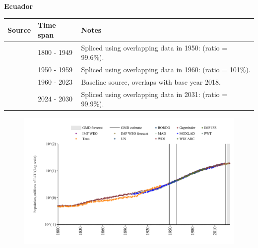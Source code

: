 \documentclass[12pt,a4paper,landscape]{article}
\begin{document}
\begin{adjustbox}{max totalsize={\paperwidth}{\paperheight},center}
\begin{minipage}[t][\textheight][t]{\textwidth}
\vspace*{0.5cm}
{}
\begin{center}
{\Large\bfseries Ecuador}
\end{center}
\vspace{0.5cm}
\begin{table}[H]
\centering
\small
\begin{tabular}{|l|l|l|}
\hline
\textbf{Source} & \textbf{Time span} & \textbf{Notes} \\
\hline
\rowcolor{white}\cite{Gapminder}& 1800 - 1949 &Spliced using overlapping data in 1950: (ratio = 99.6\%).\\
\rowcolor{lightgray}\cite{IMF_IFS}& 1950 - 1959 &Spliced using overlapping data in 1960: (ratio = 101\%).\\
\rowcolor{white}\cite{WDI}& 1960 - 2023 &Baseline source, overlaps with base year 2018.\\
\rowcolor{lightgray}\cite{Gapminder}& 2024 - 2030 &Spliced using overlapping data in 2031: (ratio = 99.9\%).\\
\hline
\end{tabular}
\end{table}
\begin{figure}[H]
\centering
\includegraphics[width=\textwidth,height=0.6\textheight,keepaspectratio]{graphs/ECU_pop.pdf}
\end{figure}
\end{minipage}
\end{adjustbox}
\end{document}
